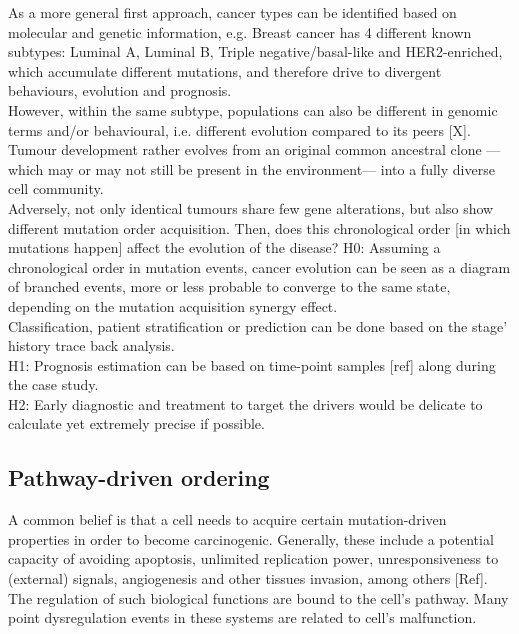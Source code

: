 As a more general first approach, cancer types can be identified based on molecular and genetic information, e.g. Breast cancer has 4 different known subtypes: Luminal A, Luminal B, Triple negative/basal-like and HER2-enriched, which accumulate different mutations, and therefore drive to divergent behaviours, evolution and prognosis.
\\

However, within the same subtype, populations can also be different in genomic terms and/or behavioural, i.e. different evolution compared to its peers [X]. Tumour development  rather evolves from an original common ancestral clone —which may or may not still be present in the environment— into a fully diverse cell community.
\\

Adversely, not only identical tumours share few gene alterations, but also show different mutation order acquisition. Then, does this chronological order [in which mutations happen] affect the evolution of the disease?
H0: Assuming a chronological order in mutation events, cancer evolution can be seen as a diagram of branched events, more or less probable to converge to the same state, depending on the mutation acquisition synergy effect.
\\

Classification, patient stratification or prediction can be done based on the stage’ history trace back analysis. 
\\

H1: Prognosis estimation can be based on time-point samples [ref] along during the case study. 
\\

H2: Early diagnostic and treatment to target the drivers would be delicate to calculate yet extremely precise if possible. 
\\

\subsection{Pathway-driven ordering}
A common belief is that a cell needs to acquire certain mutation-driven properties in order to become carcinogenic. Generally, these include a potential capacity of avoiding apoptosis, unlimited replication power, unresponsiveness to (external) signals, angiogenesis and other tissues invasion, among others \cite{Hanahan2011HallmarksGeneration} [Ref]. The regulation of such biological functions are bound to the cell’s pathway. Many point dysregulation events in these systems are related to cell’s malfunction.
\\

